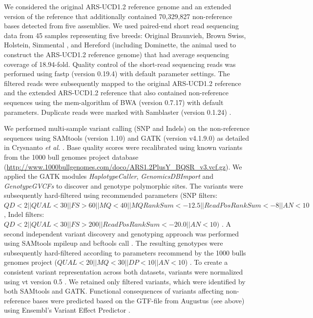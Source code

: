 \documentclass[../main.tex]{subfiles}
\begin{document}
We considered the original ARS-UCD1.2 reference genome and an extended version of the reference that additionally contained 70,329,827 non-reference bases detected from five assemblies. We used paired-end short read sequencing data from 45 samples representing five breeds: Original Braunvieh, Brown Swiss, Holstein, Simmental \citep{hafliger2020il17ra}, and Hereford (including Dominette, the animal used to construct the ARS-UCD1.2 reference genome) \citep{rosen2020novo,young2020genomic} that had average sequencing coverage of 18.94-fold. Quality control of the short-read sequencing reads was performed using fastp (version 0.19.4) \citep{chen2018fastp} with default parameter settings. The filtered reads were subsequently mapped to the original ARS-UCD1.2 reference and the extended ARS-UCD1.2 reference that also contained non-reference sequences using the mem-algorithm of BWA (version 0.7.17) \citep{li2013aligning} with default parameters. Duplicate reads were marked with Samblaster (version 0.1.24) \citep{faust2014samblaster}. 

We performed multi-sample variant calling (SNP and Indels) on the non-reference sequences using SAMtools (version 1.10) \citep{li2009sequence} and GATK (version v4.1.9.0) \citep{poplin201178others} as detailed in Crysnanto \emph{ et al.} \citep{crysnanto2019accurate}. Base quality scores were recalibrated using known variants from the 1000 bull genomes project database (\url{http://www.1000bullgenomes.com/doco/ARS1.2PlusY_BQSR_v3.vcf.gz}). We applied the GATK modules \emph{HaplotypeCaller}, \emph{GenomicsDBImport} and \emph{GenotypeGVCFs} to discover and genotype polymorphic sites. The variants were subsequently hard-filtered using recommended parameters (SNP filters: $QD < 2 || QUAL < 30 || FS > 60 || MQ < 40 || MQRankSum < -12.5 || ReadPosRankSum < -8 || AN < 10$, Indel filters: $QD < 2 || QUAL < 30 || FS > 200 || ReadPosRankSum < -20.0 || AN < 10)$ \citep{crysnanto2019accurate}. A second independent variant discovery and genotyping approach was performed using SAMtools mpileup and bcftools call \citep{li2009sequence}. The resulting genotypes were subsequently hard-filtered according to parameters recommend by the 1000 bulls genomes project ($QUAL < 20 || MQ < 30 || DP < 10 || AN < 10$) \citep{daetwyler2014whole}. To create a consistent variant representation across both datasets, variants were normalized using vt version 0.5 \citep{tan2015unified}. We retained only filtered variants, which were identified by both SAMtools and GATK. Functional consequences of variants affecting non-reference bases were predicted based on the GTF-file from Augustus (see above) using Ensembl’s Variant Effect Predictor \citep{mclaren2016ensembl}.
\end{document}

